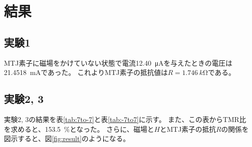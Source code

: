 \documentclass[../../../main]{subfiles}
\begin{document}
\section{結果}

\subsection{実験1}
MTJ素子に磁場をかけていない状態で電流\SI{12.40}{\micro A}を与えたときの電圧は\SI{21.4518}{mA}であった。
これよりMTJ素子の抵抗値は$R = \SI{1.746}{k\ohm}$である。

\subsection{実験2, 3}
実験2, 3の結果を表\ref{tab:7to-7}と表\ref{tab:-7to7}に示す。
また、この表からTMR比を求めると、\SI{153.5}{\%}となった。
さらに、磁場と$H$とMTJ素子の抵抗$R$の関係を図示すると、図\ref{fig:result}のようになる。




\end{document}
